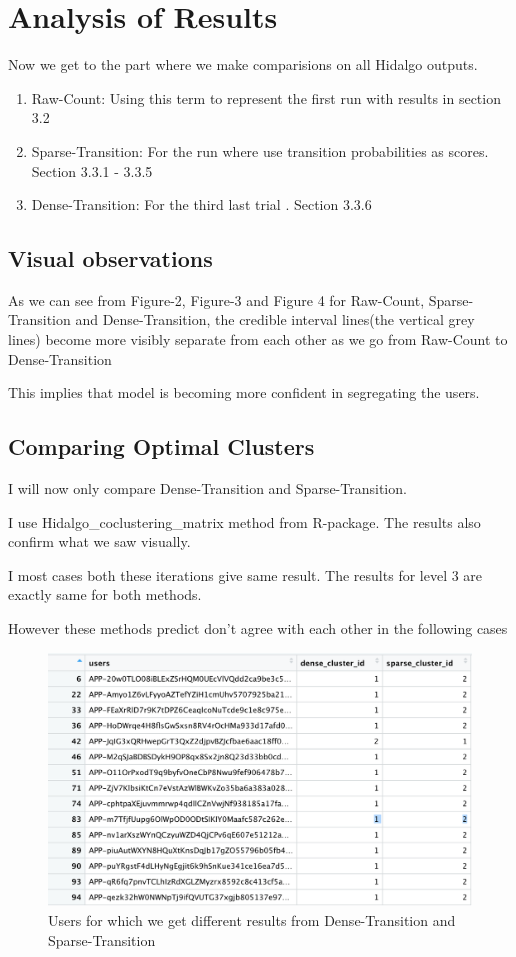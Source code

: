 \documentclass{article}
\begin{document}
\section{Analysis of Results}
Now we get to the part where we make comparisions on all Hidalgo outputs.
\begin{enumerate}
    \item Raw-Count: Using this term to represent the first run with results in section 3.2
    \item Sparse-Transition: For the run where use transition probabilities as scores. Section 3.3.1 - 3.3.5
    \item Dense-Transition: For the third last trial . Section 3.3.6 
\end{enumerate}

\subsection{Visual observations}
As we can see from Figure-2, Figure-3 and Figure 4 for Raw-Count, Sparse-Transition and Dense-Transition, the credible interval lines(the vertical grey lines) become more visibly separate from each other as we go from Raw-Count to Dense-Transition

This implies that model is becoming more confident in segregating the users.


\subsection{Comparing Optimal Clusters}
I will now only compare Dense-Transition and Sparse-Transition.

I use Hidalgo\_coclustering\_matrix method from R-package. The results also confirm what we saw visually.

I most cases both these iterations give same result. The results for level 3 are exactly same for both methods.

However these methods predict don't agree with each other in the following cases


\begin{figure}[H]
  \includegraphics[width=1.3\textwidth]{Diff-Between-Desne-Sparse.png}
  \caption{Users for which we get different results from Dense-Transition and Sparse-Transition}
\label{fig}
\end{figure}
\end{document}
